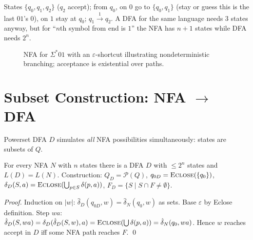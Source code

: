 \begin{example}
States $\{q_0,q_1,q_2\}$ ($q_2$ accept); from $q_0$, on $0$ go to $\{q_0,q_1\}$ (stay or guess this is the last $01$'s $0$), on $1$ stay at $q_0$; $q_1\xrightarrow{1}q_2$. A DFA for the same language needs $3$ states anyway, but for ``$n$th symbol from end is $1$'' the NFA has $n+1$ states while DFA needs $2^n$.
\end{example}

\begin{figure}[h]
\centering
{}
\caption{NFA for $\Sigma^*01$ with an $\varepsilon$-shortcut illustrating nondeterministic branching; acceptance is existential over paths.}
\label{fig:nfa-epsilon}
\end{figure}

\section{Subset Construction: NFA $\to$ DFA}
\label{sec:subset}
Powerset DFA $D$ simulates \emph{all} NFA possibilities simultaneously: states are subsets of $Q$.

\begin{theorem}
For every NFA $N$ with $n$ states there is a DFA $D$ with $\le2^n$ states and $L(D)=L(N)$. Construction: $Q_D=\mathcal{P}(Q)$, $q_{0D}=\textsc{Eclose}(\{q_0\})$, $\delta_D(S,a)=\textsc{Eclose}(\bigcup_{p\in S}\delta(p,a))$, $F_D=\{S\mid S\cap F\neq\emptyset\}$.
\end{theorem}
\begin{proof}
Induction on $|w|$: $\hat\delta_D(q_{0D},w)=\hat\delta_N(q_0,w)$ as sets. Base $\varepsilon$ by Eclose definition. Step $wa$: $\hat\delta_D(S,wa)=\delta_D(\hat\delta_D(S,w),a)=\textsc{Eclose}(\bigcup\delta(p,a))=\hat\delta_N(q_0,wa)$. Hence $w$ reaches accept in $D$ iff some NFA path reaches $F$. \qed
\end{proof}

